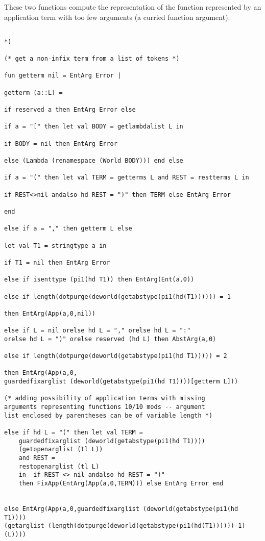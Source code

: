 \documentclass{article}
\begin{document}
These two functions compute the representation of the function represented by an application term with too few arguments (a curried function argument).

\begin{verbatim}

*)

(* get a non-infix term from a list of tokens *)

fun getterm nil = EntArg Error |

getterm (a::L) =

if reserved a then EntArg Error else

if a = "[" then let val BODY = getlambdalist L in

if BODY = nil then EntArg Error

else (Lambda (renamespace (World BODY))) end else

if a = "(" then let val TERM = getterms L and REST = restterms L in

if REST<>nil andalso hd REST = ")" then TERM else EntArg Error

end 

else if a = "," then getterm L else

let val T1 = stringtype a in

if T1 = nil then EntArg Error

else if isenttype (pi1(hd T1)) then EntArg(Ent(a,0))

else if length(dotpurge(deworld(getabstype(pi1(hd(T1)))))) = 1

then EntArg(App(a,0,nil))

else if L = nil orelse hd L = "," orelse hd L = ":" 
orelse hd L = ")" orelse reserved (hd L) then AbstArg(a,0)

else if length(dotpurge(deworld(getabstype(pi1(hd T1))))) = 2

then EntArg(App(a,0,
guardedfixarglist (deworld(getabstype(pi1(hd T1))))[getterm L]))

(* adding possibility of application terms with missing
arguments representing functions 10/10 mods -- argument
list enclosed by parentheses can be of variable length *)

else if hd L = "(" then let val TERM = 
    guardedfixarglist (deworld(getabstype(pi1(hd T1)))) 
    (getopenarglist (tl L))
    and REST = 
    restopenarglist (tl L) 
    in  if REST <> nil andalso hd REST = ")" 
    then FixApp(EntArg(App(a,0,TERM))) else EntArg Error end


else EntArg(App(a,0,guardedfixarglist (deworld(getabstype(pi1(hd T1))))
(getarglist (length(dotpurge(deworld(getabstype(pi1(hd(T1))))))-1)  (L))))


\end{verbatim}
\end{document}
